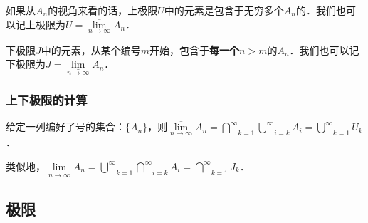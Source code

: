 如果从$A_n$的视角来看的话，上极限$U$中的元素是包含于无穷多个$A_n$的．我们也可以记上极限为$U=\overline{\lim}\limits_{n\rightarrow \infty}A_n$．

下极限$J$中的元素，从某个编号$m$开始，包含于\textbf{每一个}$n>m$的$A_n$．我们也可以记下极限为$J=\underline{\lim}\limits_{n\rightarrow \infty}A_n$．

\subsubsection{上下极限的计算}
给定一列编好了号的集合：$\{A_n\}$，则$\overline{\lim}\limits_{n\rightarrow \infty}A_n=\overset{\infty}\bigcap\limits_{k=1}\overset{\infty}\bigcup\limits_{i=k}A_i=\overset{\infty}\bigcup\limits_{k=1}U_k$．

类似地，$\underline{\lim}\limits_{n\rightarrow \infty}A_n=\overset{\infty}\bigcup\limits_{k=1}\overset{\infty}\bigcap\limits_{i=k}A_i=\overset{\infty}\bigcap\limits_{k=1}J_k$．

\subsection{极限}
